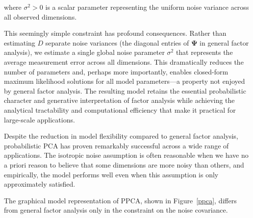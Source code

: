 where $\sigma^2 > 0$ is a scalar parameter representing the uniform noise variance across all observed dimensions.

This seemingly simple constraint has profound consequences. Rather than estimating $D$ separate noise variances (the diagonal entries of $\boldsymbol{\Psi}$ in general factor analysis), we estimate a single global noise parameter $\sigma^2$ that represents the average measurement error across all dimensions. This dramatically reduces the number of parameters and, perhaps more importantly, enables closed-form maximum likelihood solutions for all model parameters—a property not enjoyed by general factor analysis. The resulting model retains the essential probabilistic character and generative interpretation of factor analysis while achieving the analytical tractability and computational efficiency that make it practical for large-scale applications.

Despite the reduction in model flexibility compared to general factor analysis, probabilistic PCA has proven remarkably successful across a wide range of applications. The isotropic noise assumption is often reasonable when we have no a priori reason to believe that some dimensions are more noisy than others, and empirically, the model performs well even when this assumption is only approximately satisfied.

The graphical model representation of PPCA, shown in Figure~\ref{ppca}, differs from general factor analysis only in the constraint on the noise covariance.

